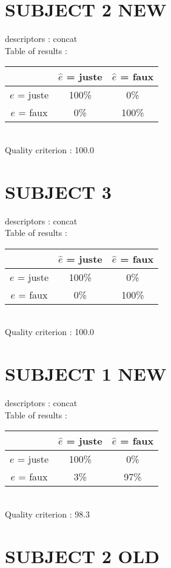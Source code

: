 \section*{SUBJECT 2 NEW}
descriptors : concat \\
Table of results : \\
\begin{tabular}{|c|c|c|}
\hline				& $\hat{e}$ = juste & $\hat{e}$ = faux \\
\hline  $e$ = juste	&    100\%			&      0\%		\\
\hline  $e$ = faux	&      0\%			&    100\%		\\
\hline
\end{tabular}\\
Quality criterion :  100.0 \\

\section*{SUBJECT 3}
descriptors : concat \\
Table of results : \\
\begin{tabular}{|c|c|c|}
\hline				& $\hat{e}$ = juste & $\hat{e}$ = faux \\
\hline  $e$ = juste	&    100\%			&      0\%		\\
\hline  $e$ = faux	&      0\%			&    100\%		\\
\hline
\end{tabular}\\
Quality criterion :  100.0 \\

\newpage
\section*{SUBJECT 1 NEW}
descriptors : concat \\
Table of results : \\
\begin{tabular}{|c|c|c|}
\hline				& $\hat{e}$ = juste & $\hat{e}$ = faux \\
\hline  $e$ = juste	&    100\%			&      0\%		\\
\hline  $e$ = faux	&      3\%			&     97\%		\\
\hline
\end{tabular}\\
Quality criterion :   98.3 \\

\newpage
\section*{SUBJECT 2 OLD}
\newpage
